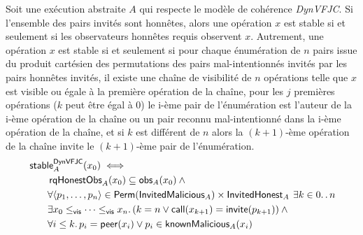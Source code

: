 \begin{theorem}\label{th:svfjc-stability}
Soit une exécution abstraite $A$ qui respecte le modèle de cohérence \emph{DynVFJC}.
Si l'ensemble des pairs invités sont honnêtes, alors une opération $x$ est stable si et seulement si les observateurs honnêtes requis observent $x$.
Autrement, une opération $x$ est stable si et seulement si pour chaque énumération de $n$ pairs issue du produit cartésien des permutations des pairs mal-intentionnés invités par les pairs honnêtes invités, il existe une chaîne de visibilité de $n$ opérations telle que $x$ est visible ou égale à la première opération de la chaîne, pour les $j$ premières opérations ($k$ peut être égal à $0$) le i-ème pair de l'énumération est l'auteur de la i-ème opération de la chaîne ou un pair reconnu mal-intentionné dans la i-ème opération de la chaîne, et si $k$ est différent de $n$ alors la $(k+1)$-ème opération de la chaîne invite le $(k+1)$-ème pair de l'énumération.
\begin{equation*}\begin{split}
\MoveEqLeft\trm{stable}_A^{\trm{DynVFJC}}(x_0) \iff\\
    &\trm{rqHonestObs}_A(x_0) \subseteq \trm{obs}_A(x_0) \:\land \\
    &\forall \tuple*{p_1, \dotsc, p_n} \in \trm{Perm}(\trm{InvitedMalicious}_A) \times \trm{InvitedHonest}_A
    \:\exists k \in 0 \ldotp\ldotp n \\
    & \exists x_0 \viseq \dotsb \viseq x_n \qsep
    (k = n \lor \trm{call}(x_{k+1}) = \trm{invite}(p_{k+1})) \:\land\\
    &\forall i \leq k \qsep p_i = \trm{peer}(x_i) \lor p_i \in \trm{knownMalicious}_A(x_i)
\end{split}\end{equation*}
\end{theorem}

